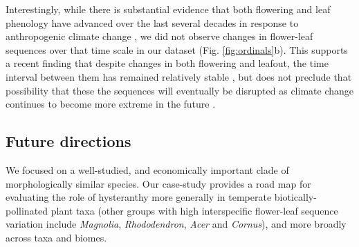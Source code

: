 \documentclass{article}[12pt]
\begin{document}
{{%
Interestingly, while there is substantial evidence that both flowering and leaf phenology have advanced over the last several decades in response to anthropogenic climate change \citep{Menzel2006,Cleland2007,Augspurger:2020aa}, we did not observe changes in flower-leaf sequences over that time scale in our dataset (Fig. \ref{fig:ordinals}b). This supports a recent finding that despite changes in both flowering and leafout, the time interval between them has remained relatively stable \citep{Guo:2023wb}, but does not preclude that possibility that these the sequences will eventually be disrupted as climate change continues to become more extreme in the future \citep{Buonaiuto_2021}.

\subsection*{Future directions}
We focused on a well-studied, and economically important clade of morphologically similar species. Our case-study provides a road map for evaluating the role of hysteranthy more generally in temperate biotically-pollinated plant taxa (other groups with high interspecific flower-leaf sequence variation include \emph{Magnolia}, \emph{Rhododendron}, \emph{Acer} and \emph{Cornus}), and more broadly across taxa and biomes.

}}
\end{document}
